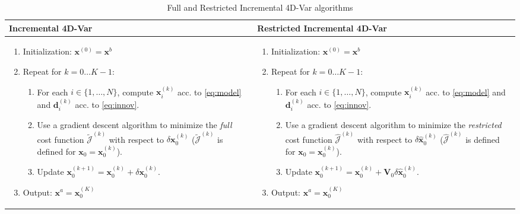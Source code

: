 \documentclass[a4paper,10pt]{article}
\newcommand{\MJ}{\mathcal J}
\newcommand{\BV}{{\mathbf V}}
\newcommand{\bx}{{\boldsymbol x}}
\newcommand{\bd}{{\boldsymbol d}}
\newcommand{\hx}{\hat \bx}
\newcommand{\dx}{\delta \bx}
\newcommand{\dhx}{\delta \hx}
\newcommand{\TJ}{\widetilde{\MJ}}
\newcommand{\HJ}{\hat{\MJ}}
\newcommand{\bxstep}[1]{\bx^{(#1)}}
\newcommand{\dxstep}[1]{\dx^{(#1)}}
\newcommand{\bdstep}[1]{\bd^{(#1)}}
\newcommand{\dhxstep}[1]{\dhx^{(#1)}}
\newcommand{\bxz}{\bxstep{0}}
\newcommand{\bxk}{\bxstep{k}}
\newcommand{\dxk}{\dxstep{k}}
\newcommand{\bdk}{\bdstep{k}}
\newcommand{\dhxk}{\dhxstep{k}}
\newcommand{\TJk}{\TJ^{(k)}}
\newcommand{\HJk}{\HJ^{(k)}}
\newcommand{\ioton}{i \in \{1, \dots, N\}}
\begin{document}
\begin{table}[ht]
	\begin{tabularx}{\textwidth}{XX}
		\textbf{Incremental 4D-Var} & \textbf{Restricted Incremental 4D-Var} \\
		\hline
		\begin{enumerate}
			\item Initialization: $\bxz = \bx^b$
			
			\item Repeat for $k = 0 \dots K-1$:
			\begin{enumerate}
				\item For each $\ioton$, compute $\bxk_i$ acc. to \eqref{eq:model} and $\bdk_i$ acc. to \eqref{eq:innov}.
				
				\item Use a gradient descent algorithm to minimize the \emph{full} cost function $\TJk$ with respect to $\dxk_0$ ($\TJk$ is defined for $\bx_0 = \bxk_0$). 
				
				\item Update $\bxstep{k+1}_0 = \bxk_0 + \dxk_0$.
			\end{enumerate}
			
			\item Output: $\bx^a = \bxstep{K}_0$
		\end{enumerate}  &
		\begin{enumerate}
			\item Initialization: $\bxz = \bx^b$
			
			\item Repeat for $k = 0 \dots K-1$:
			\begin{enumerate}
				\item For each $\ioton$, compute $\bxk_i$ acc. to \eqref{eq:model} and $\bdk_i$ acc. to \eqref{eq:innov}.
				
				\item Use a gradient descent algorithm to minimize the \emph{restricted} cost function $\HJk$ with respect to $\dhxk_0$ ($\HJk$ is defined for $\bx_0 = \bxk_0$). 
				
				\item Update $\bxstep{k+1}_0 = \bxk_0 + \BV_0 \dhxk_0$.
			\end{enumerate}
			
			\item Output: $\bx^a = \bxstep{K}_0$
		\end{enumerate} \\
		\hline
	\end{tabularx}
	\caption{Full and Restricted Incremental 4D-Var algorithms}
	\label{tab:4dvar_restr}
\end{table}
\end{document}
